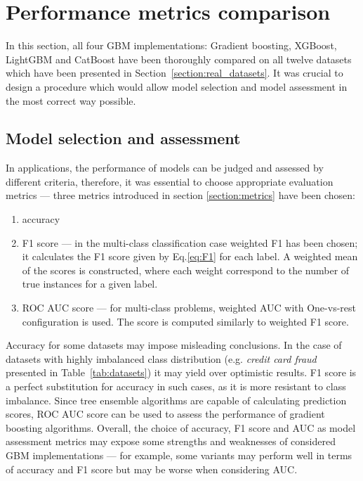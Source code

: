 \documentclass[magisterska, english]{pwr_wmat_praca_dyplomowa}
\theoremstyle{plain}
\numberwithin{theorem}{chapter}
\theoremstyle{definition}
\numberwithin{theorem}{chapter}
\begin{document}
\section{Performance metrics comparison}
In this section, all four GBM implementations: Gradient boosting, XGBoost, LightGBM and CatBoost have been thoroughly compared on all twelve datasets which have been presented in Section~\ref{section:real_datasets}. It was crucial to design a procedure which would allow model selection and model assessment in the most correct way possible.

\subsection{Model selection and assessment}
In applications, the performance of models can be judged and assessed by different criteria, therefore, it was essential to choose appropriate evaluation metrics --- three metrics introduced in section \ref{section:metrics} have been chosen:

\begin{enumerate} %
    \item accuracy
    \item F1 score --- in the multi-class classification case weighted F1 has been chosen; it calculates the F1 score given by Eq.\eqref{eq:F1} for each label. A weighted mean of the scores is constructed, where each weight correspond to the number of true instances for a given label.
    \item ROC AUC score --- for multi-class problems, weighted AUC with One-vs-rest configuration is used. The score is computed similarly to weighted F1 score.
\end{enumerate}

Accuracy for some datasets may impose misleading conclusions. In the case of datasets with highly imbalanced class distribution (e.g. \emph{credit card fraud} presented in Table~\ref{tab:datasets}) it may yield over optimistic results. F1 score is a perfect substitution for accuracy in such cases, as it is more resistant to class imbalance. Since tree ensemble algorithms are capable of calculating prediction scores, ROC AUC score can be used to assess the performance of gradient boosting algorithms. Overall, the choice of accuracy, F1 score and AUC as model assessment metrics may expose some strengths and weaknesses of considered GBM implementations --- for example, some variants may perform well in terms of accuracy and F1 score but may be worse when considering AUC.
\end{document}
